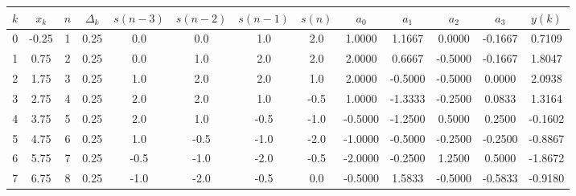 \documentclass[border=3mm]{standalone}
\begin{document}
\begin{tabular}{
		*{1}{S[table-format = 2.0]}
		*{1}{S[table-format = 2.2]}
		*{1}{S[table-format = 2.0]}
		*{1}{S[table-format = 2.2]}
		*{1}{S[table-format = 3.1]}
		*{1}{S[table-format = 3.1]}
		*{1}{S[table-format = 3.1]}
		*{1}{S[table-format = 3.1]}
		*{1}{S[table-format = 3.3]}
		*{1}{S[table-format = 3.3]}
		*{1}{S[table-format = 3.3]}
		*{1}{S[table-format = 3.3]}
		*{1}{S[table-format = 3.4]}
	}
	
\toprule
{$k$} & {$x_k$}  &   {$n$}  &   {$\Delta_k$}  & {$s(n-3)$} &  {$s(n-2)$} &  {$s(n-1)$} &  {$s(n)$} & {$a_0$}  &  {$a_1$} & {$a_2$} & {$a_3$} & {$y(k)$}\\  
 & -0.25 &  1 &  0.25  &	\color{red} 0.0	& \color{red} 0.0	&  1.0 &   2.0 				&    1.0000 &   1.1667 &  0.0000 & -0.1667 &   0.7109 \\
  1 &  0.75 &  2 &  0.25  &	\color{red} 0.0	&  1.0  			&  2.0 &   2.0 				&    2.0000 &   0.6667 & -0.5000 & -0.1667 &   1.8047 \\
  2 &  1.75 &  3 &  0.25  &   1.0   		&  2.0  			&  2.0 &   1.0 				&    2.0000 &  -0.5000 & -0.5000 &  0.0000 &   2.0938 \\
  3 &  2.75 &  4 &  0.25  &   2.0   		&  2.0  			&  1.0 &  -0.5 				&    1.0000 &  -1.3333 & -0.2500 &  0.0833 &   1.3164 \\
  4 &  3.75 &  5 &  0.25  &   2.0   		&  1.0  			& -0.5 &  -1.0 				&   -0.5000 &  -1.2500 &  0.5000 &  0.2500 &  -0.1602 \\
  5 &  4.75 &  6 &  0.25  &   1.0   		& -0.5  			& -1.0 &  -2.0 				&   -1.0000 &  -0.5000 & -0.2500 & -0.2500 &  -0.8867 \\
  6 &  5.75 &  7 &  0.25  &  -0.5   		& -1.0  			& -2.0 &  -0.5 				&   -2.0000 &  -0.2500 &  1.2500 &  0.5000 &  -1.8672 \\
  7 &  6.75 &  8 &  0.25  &  -1.0   		& -2.0  			& -0.5 &  \color{red} 0.0	&   -0.5000 &   1.5833 & -0.5000 & -0.5833 &  -0.9180 \\
\bottomrule

\end{tabular}
\end{document}
